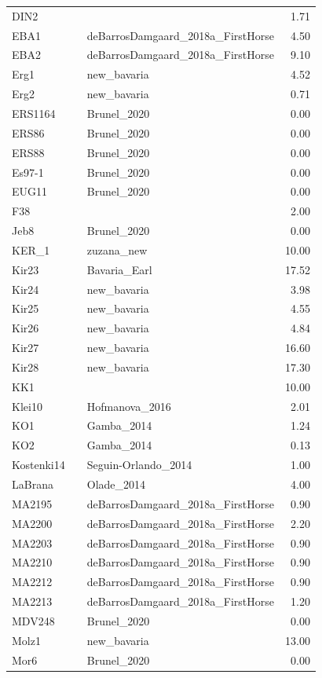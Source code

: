 \begin{longtable}[t]{lllr}
DIN2 &  &  & 1.71\\
EBA1 &  & deBarrosDamgaard\_2018a\_FirstHorse & 4.50\\
EBA2 &  & deBarrosDamgaard\_2018a\_FirstHorse & 9.10\\
Erg1 &  & new\_bavaria & 4.52\\
Erg2 &  & new\_bavaria & 0.71\\
ERS1164 &  & Brunel\_2020 & 0.00\\
ERS86 &  & Brunel\_2020 & 0.00\\
ERS88 &  & Brunel\_2020 & 0.00\\
Es97-1 &  & Brunel\_2020 & 0.00\\
EUG11 &  & Brunel\_2020 & 0.00\\
F38 &  &  & 2.00\\
Jeb8 &  & Brunel\_2020 & 0.00\\
KER\_1 &  & zuzana\_new & 10.00\\
Kir23 &  & Bavaria\_Earl & 17.52\\
Kir24 &  & new\_bavaria & 3.98\\
Kir25 &  & new\_bavaria & 4.55\\
Kir26 &  & new\_bavaria & 4.84\\
Kir27 &  & new\_bavaria & 16.60\\
Kir28 &  & new\_bavaria & 17.30\\
KK1 &  &  & 10.00\\
Klei10 &  & Hofmanova\_2016 & 2.01\\
KO1 &  & Gamba\_2014 & 1.24\\
KO2 &  & Gamba\_2014 & 0.13\\
Kostenki14 &  & Seguin-Orlando\_2014 & 1.00\\
LaBrana &  & Olade\_2014 & 4.00\\
MA2195 &  & deBarrosDamgaard\_2018a\_FirstHorse & 0.90\\
MA2200 &  & deBarrosDamgaard\_2018a\_FirstHorse & 2.20\\
MA2203 &  & deBarrosDamgaard\_2018a\_FirstHorse & 0.90\\
MA2210 &  & deBarrosDamgaard\_2018a\_FirstHorse & 0.90\\
MA2212 &  & deBarrosDamgaard\_2018a\_FirstHorse & 0.90\\
MA2213 &  & deBarrosDamgaard\_2018a\_FirstHorse & 1.20\\
MDV248 &  & Brunel\_2020 & 0.00\\
Molz1 &  & new\_bavaria & 13.00\\
Mor6 &  & Brunel\_2020 & 0.00\\

\end{longtable}
